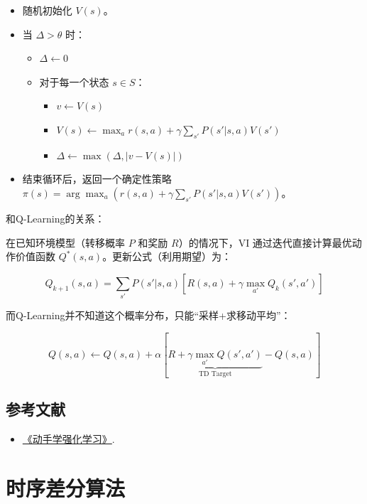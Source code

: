 \begin{itemize}
\tightlist
\item
  随机初始化 \(V(s)\)。
\item
  当 \(\Delta>\theta\) 时：

  \begin{itemize}
  \tightlist
  \item
    \(\Delta\leftarrow 0\)
  \item
    对于每一个状态 \(s\in S\)：

    \begin{itemize}
    \tightlist
    \item
      \(v\leftarrow V(s)\)
    \item
      \(V(s)\leftarrow \max_a r(s,a)+\gamma\sum_{s'}P(s'|s,a)V(s')\)
    \item
      \(\Delta\leftarrow \max(\Delta,|v-V(s)|)\)
    \end{itemize}
  \end{itemize}
\item
  结束循环后，返回一个确定性策略 \(\pi(s)=\arg\max_a(r(s,a)+\gamma\sum_{s'}P(s'|s,a)V(s'))\)。
\end{itemize}

和Q-Learning的关系：

在已知环境模型（转移概率 \(P\) 和奖励 \(R\)）的情况下，VI 通过迭代直接计算最优动作价值函数 \(Q^{*}(s,a)\)。更新公式（利用期望）为：

\[
Q_{k+1}(s,a)=\sum_{s'}P(s'|s,a)[R(s,a)+\gamma\max_{a'}Q_k(s',a')]
\]

而Q-Learning并不知道这个概率分布，只能``采样+求移动平均''：

\[
Q(s,a)\leftarrow Q(s,a)+\alpha[\underbrace{R+\gamma\max_{a'}Q(s',a')}_{\text{TD Target}}-Q(s,a)]
\]

\hypertarget{ux53c2ux8003ux6587ux732e-45}{%
\subsection{参考文献}\label{ux53c2ux8003ux6587ux732e-45}}

\begin{itemize}
\tightlist
\item
  \href{https://hrl.boyuai.com/}{《动手学强化学习》}.
\end{itemize}

\clearpage

\hypertarget{ux65f6ux5e8fux5deeux5206ux7b97ux6cd5}{%
\section{时序差分算法}\label{ux65f6ux5e8fux5deeux5206ux7b97ux6cd5}}

